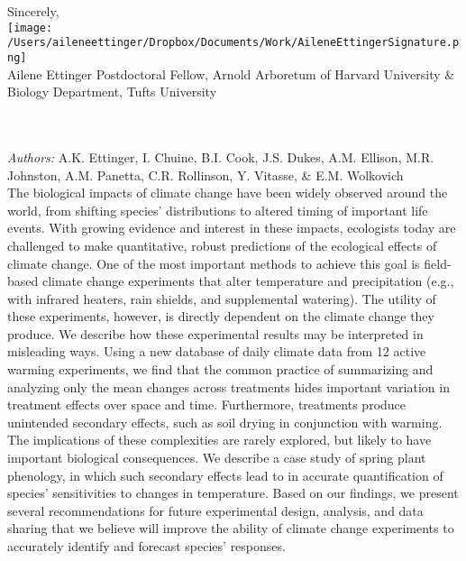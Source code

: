 \documentclass[12pt,a4paper]{letter}
\begin{document}
\begin{letter}{}
Sincerely,\\

\texttt{[image: /Users/aileneettinger/Dropbox/Documents/Work/AileneEttingerSignature.png]} \\
Ailene Ettinger
Postdoctoral Fellow, Arnold Arboretum of Harvard University \& Biology Department, Tufts University

\newpage
{}\\
\\
\noindent \emph{Authors:} A.K. Ettinger, I. Chuine, B.I. Cook, J.S. Dukes, A.M. Ellison, M.R. Johnston, A.M. Panetta, C.R. Rollinson, Y. Vitasse, \& E.M. Wolkovich
\\
The biological impacts of climate change have been widely observed around the world, from shifting species' distributions to altered timing of important life events. With growing evidence and interest in these impacts, ecologists today are challenged to make quantitative, robust predictions of the ecological effects of climate change. One of the most important methods to achieve this goal is field-based climate change experiments that alter temperature and precipitation (e.g., with infrared heaters, rain shields, and supplemental watering). The utility of these experiments, however, is directly dependent on the climate change they produce. We describe how these experimental results may be interpreted in misleading ways. Using a new database of daily climate data from 12 active warming experiments, we find that the common practice of summarizing and analyzing only the mean changes across treatments hides important variation in treatment effects over space and time. Furthermore, treatments produce unintended secondary effects, such as soil drying in conjunction with warming. The implications of these complexities are rarely explored, but likely to have important biological consequences. We describe a case study of spring plant phenology, in which such secondary effects lead to in accurate quantification of species' sensitivities to changes in temperature. Based on our findings, we present several recommendations for future experimental design, analysis, and data sharing that we believe will improve the ability of climate change experiments to accurately identify and forecast species' responses.
\end{letter}
\end{document}
